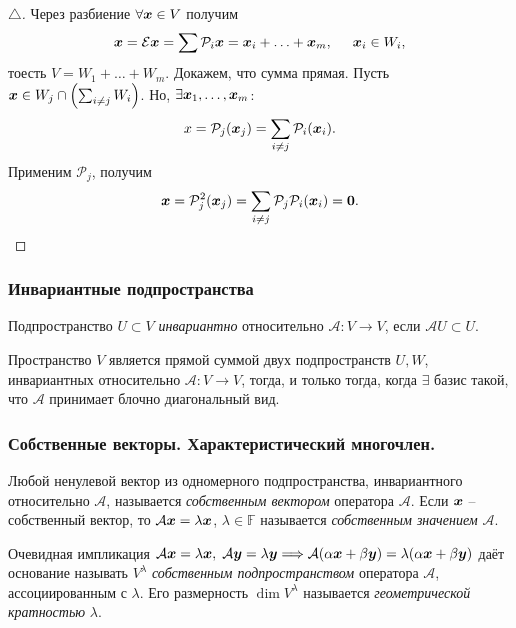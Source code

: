 \begin{proof}[$\triangle$]
    Через разбиение $\forall \mbox{\boldmath $x$} \in V $ получим
$$
    \mbox{\boldmath $x$} = \mathcal E \mbox{\boldmath $x$} = \sum \mathcal P_i \mbox{\boldmath $x$} = \mbox{\boldmath $x$}_i + \ldots + \mbox{\boldmath $x$}_m, \hspace{0.5cm} \mbox{\boldmath $x$}_i \in W_i,
$$
тоесть $V = W_1 + \ldots + W_m$. Докажем, что сумма прямая. Пусть $\mbox{\boldmath $x$} \in W_j \cap \left(\sum_{i \neq j} W_i\right) $. Но, $\exists \mbox{\boldmath $x$}_1, \ldots, \mbox{\boldmath $x$}_m $:
$$
    x = \mathcal P_j (\mbox{\boldmath $x$}_j) = \sum_{i \neq j} \mathcal P_i (\mbox{\boldmath $x$}_i).
$$
Применим $\mathcal P_j $, получим
$$
    \mbox{\boldmath $x$} = \mathcal P_j^2 (\mbox{\boldmath $x$}_j) = \sum_{i \neq j} \mathcal P_j \mathcal P_i (\mbox{\boldmath $x$}_i) = \mbox{\boldmath $0$}.
$$
\end{proof}



\subsubsection{Инвариантные подпространства}

\begin{to_def} 
    Подпространство $U \subset V $ \textit{инвариантно} относительно $\mathcal A \colon V \to V$, если $\mathcal A U \subset U $. 
\end{to_def}

\begin{to_thr} 
    Пространство $V $ является прямой суммой двух подпространств $U, W $, инвариантных относительно $\mathcal A \colon V \to V $, тогда, и только тогда, когда $\exists $ базис такой, что $\mathcal A $ принимает блочно диагональный вид.
\end{to_thr}


\subsubsection{Собственные векторы. Характеристический многочлен.}

\begin{to_def} 
    Любой ненулевой вектор из одномерного подпространства, инвариантного относительно $\mathcal A $, называется \textit{собственным вектором} оператора $\mathcal A $. Если $\mbox{\boldmath $x$} $ -- собственный вектор, то $\mathcal A \mbox{\boldmath $x$} = \lambda \mbox{\boldmath $x$} $, $\lambda \in \mathbb{F} $ называется \textit{собственным значением} $\mathcal A $. 
\end{to_def}

Очевидная импликация
$
     \mathcal A \mbox{\boldmath $x$} = \lambda \mbox{\boldmath $x$}, \; \mathcal A \mbox{\boldmath $y$} = \lambda \mbox{\boldmath $y$} \Longrightarrow \mathcal A(\alpha \mbox{\boldmath $x$} + \beta \mbox{\boldmath $y$}) = \lambda(\alpha \mbox{\boldmath $x$} + \beta \mbox{\boldmath $y$})
 $ 
 даёт основание называть $V^{\lambda} $ \textit{собственным подпространством} оператора $\mathcal A $, ассоциированным с $\lambda $. Его размерность $\dim V^{\lambda} $ называется \textit{геометрической кратностью} $\lambda $.

